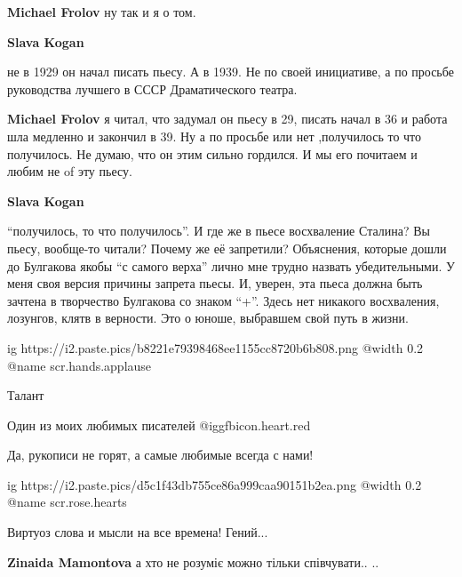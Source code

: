 \begin{itemize}
\begin{itemize}
\begin{itemize} %
\textbf{Michael Frolov} ну так и я о том.
\end{itemize} %

\textbf{Slava Kogan} 

не в 1929 он начал писать пьесу. А в 1939. Не по своей инициативе, а по просьбе
руководства лучшего в СССР Драматического театра.

\begin{itemize} %
\textbf{Michael Frolov} я читал, что задумал он пьесу в 29, писать начал в 36 и работа шла медленно и закончил в 39. Ну а по просьбе или нет ,получилось то что получилось. Не думаю, что он этим сильно гордился. И мы его почитаем и любим не of эту пьесу.
\end{itemize} %

\textbf{Slava Kogan} 

\enquote{получилось, то что получилось}. И где же в пьесе восхваление Сталина? Вы
пьесу, вообще-то читали? Почему же её запретили? Объяснения, которые дошли до
Булгакова якобы \enquote{с самого верха} лично мне трудно назвать убедительными. У меня
своя версия причины запрета пьесы. И, уверен, эта пьеса должна быть зачтена в
творчество Булгакова со знаком \enquote{+}. Здесь нет никакого восхваления, лозунгов,
клятв в верности. Это о юноше, выбравшем свой путь в жизни.

\end{itemize} %


\ifcmt
  ig https://i2.paste.pics/b8221e79398468ee1155cc8720b6b808.png
  @width 0.2
	@name scr.hands.applause
\fi


Талант

Один из моих любимых писателей @igg{fbicon.heart.red}

Да, рукописи не горят, а самые любимые всегда с нами!


\ifcmt
  ig https://i2.paste.pics/d5c1f43db755ce86a999caa90151b2ea.png
  @width 0.2
	@name scr.rose.hearts
\fi

Виртуоз слова и мысли на все времена! Гений...

\textbf{Zinaida Mamontova} а хто не розуміє можно тільки співчувати.. ..


\end{itemize}
